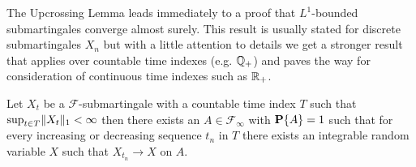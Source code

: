 The Upcrossing Lemma leads immediately to a proof that $L^1$-bounded
submartingales converge almost surely.  This result is usually stated
for discrete submartingales $X_n$ but with a little attention to details
we get a stronger result that applies over countable time indexes
(e.g. $\mathbb{Q}_+$) and paves the way for consideration of
continuous time indexes such as $\mathbb{R}_+$.
\begin{thm}\label{MartingaleConvergenceBoundedL1Discrete}Let $X_t$ be a
  $\mathcal{F}$-submartingale with a countable time index $T$ such that $\sup_{t \in
    T} \lVert X_t \rVert_1 <
  \infty$ then there exists an $A \in \mathcal{F}_\infty$ with
  $\textbf{P}\{A\} = 1$ such that for every increasing or
  decreasing sequence $t_n$ in $T$ there exists an integrable random variable $X$ such
  that $X_{t_n} \to X$ on $A$.
\end{thm}
